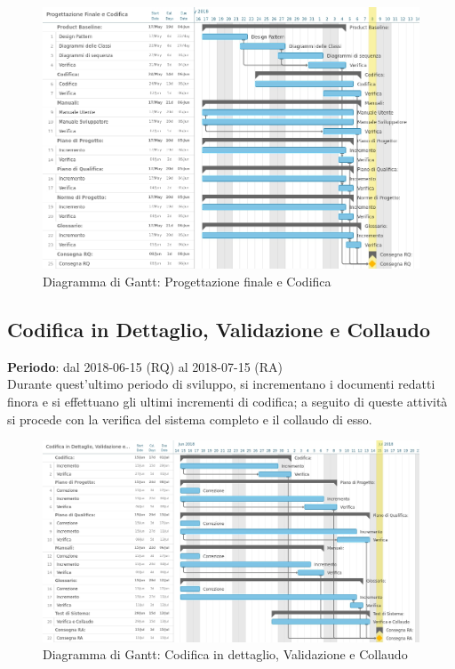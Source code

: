 \begin{figure}[h!]
	\centerline{\includegraphics[scale=0.5]{img/DiagrammiGantt/ProgettazioneFinaleCodifica.jpg}}
	\caption{Diagramma di Gantt: Progettazione finale e Codifica}
	\label{fig:gantt_prog_fin_cod}
\end{figure}
\clearpage

\subsection{Codifica in Dettaglio, Validazione e Collaudo}
\textbf{Periodo}: dal 2018-06-15 (RQ) al 2018-07-15 (RA)\\

Durante quest'ultimo periodo di sviluppo, si incrementano i documenti redatti finora e si effettuano gli ultimi incrementi di codifica; a seguito di queste attività si procede con la verifica del sistema completo e il collaudo di esso.

\begin{figure}[h!]
	\centerline{\includegraphics[scale=0.5]{img/DiagrammiGantt/CodificaValidazioneCollaudo.jpg}}
	\caption{Diagramma di Gantt: Codifica in dettaglio, Validazione e Collaudo}
	\label{fig:gantt_cod_valid_coll}
\end{figure}
\clearpage
